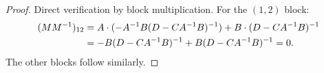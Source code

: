 \begin{proof}
Direct verification by block multiplication. For the $(1,2)$ block:
\begin{align}
(MM^{-1})_{12}
&= A \cdot (-A^{-1}B(D - CA^{-1}B)^{-1}) + B \cdot (D - CA^{-1}B)^{-1} \notag\\
&= -B(D - CA^{-1}B)^{-1} + B(D - CA^{-1}B)^{-1} = 0.
\end{align}
The other blocks follow similarly.
\end{proof}
